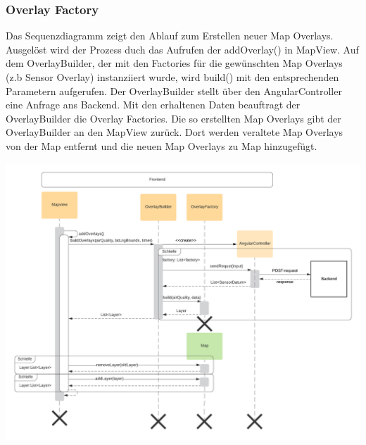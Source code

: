 \subsubsection{Overlay Factory}
\label{Screenshots}
Das Sequenzdiagramm zeigt den Ablauf zum Erstellen neuer Map Overlays. Ausgelöst wird der Prozess duch das Aufrufen der addOverlay() in MapView. Auf dem OverlayBuilder, der mit den Factories für die gewünschten Map Overlays (z.b Sensor Overlay) instanziiert wurde, wird build() mit den entsprechenden Parametern aufgerufen. Der OverlayBuilder stellt über den AngularController eine Anfrage ans Backend. Mit den erhaltenen Daten beauftragt der OverlayBuilder die Overlay Factories. Die so erstellten Map Overlays gibt der OverlayBuilder an den MapView zurück. Dort werden veraltete Map Overlays von der Map entfernt und die neuen Map Overlays zu Map hinzugefügt. 
\begin{center}
	\includegraphics[width=1\textwidth]{media/frontend/sequence-diagram/sequenceOverlayFactory.png} 
\end{center}

